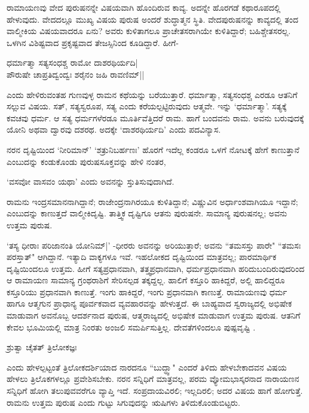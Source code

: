 ರಾಮಾಯಣವು ವೇದ ಪುರುಷನನ್ನೇ ವಿಷಯವಾಗಿ ಹೊಂದಿರುವ ಕಾವ್ಯ. ಅದನ್ನೇ ಹೊರಗಡೆ ಕಥಾರೂಪದಲ್ಲಿ ಹೇಳುವುದು. ವೇದದಲ್ಲೂ ಮುಖ್ಯ ವಿಷಯ ಪುರುಷ ಅಂದರೆ ಶುದ್ಧಾತ್ಮನ ಸ್ಥಿತಿ. ವೇದಪುರುಷನನ್ನು ಕಾವ್ಯದಲ್ಲಿ ತಂದ ವಾಲ್ಮೀಕಿಯ ವಿಷಯವಾದರೂ ಏನು? ಅವರು ಕುಳಿತಾಗಲೂ ಪ್ರಾಚೇತಸರಾಗಿಯೇ ಕುಳಿತಿದ್ದಾರೆ; ಬಹಿಶ್ಚೇತಸರಲ್ಲ. ಒಳಗಿನ ವಿಶಿಷ್ಟವಾದ ಪ್ರಕೃಷ್ಟವಾದ ತೇಜಸ್ಸಿನಿಂದ ಕೂಡಿದ್ದಾರೆ. ಹೀಗೆ-

\begin{shloka}
ಧರ್ಮಾತ್ಮಾ ಸತ್ಯಸಂಧಶ್ಚ ರಾಮೋ ದಾಶರಥಿರ್ಯದಿ|\label{250a}\\
ಪೌರುಷೇ ಚಾಪ್ರತಿದ್ವಂದ್ವಃ ಶರೈನಂ ಜಹಿ ರಾವಣಿಮ್||
\end{shloka}

ಎಂದು ಹೇಳಿರುವಂತಹ ಗುಣವುಳ್ಳ ರಾಮನ ಕಥೆಯನ್ನು ಬರೆಯುತ್ತಾರೆ. ಧರ್ಮಾತ್ಮಾ, ಸತ್ಯಸಂಧಶ್ಚ ಎರಡೂ ಆತನಿಗೆ ಸಲ್ಲುವ ವಿಷಯ. ಸತ್, ಸತ್ಯಸ್ವರೂಪ, ಸತ್ಯ ಎಂದು ಕರೆಯಲ್ಪಟ್ಟಿರುವುದು ಆತ್ಮವೇ. ಇನ್ನು `ಧರ್ಮಾತ್ಮಾ'. ಸತ್ಯಕ್ಕೆ ಕವಚವು ಧರ್ಮ.  ಆ ಸತ್ಯ ಧರ್ಮಗಳೆರಡೂ ಮೂರ್ತಿವೆತ್ತಿದರೆ ರಾಮ. ಹಾಗೆ ಬಂದವನು ರಾಮ. ಅವನು ಬರುವುದಕ್ಕೆ ಯೋನಿ ಅಥವಾ ದ್ವಾರವು ದಶರಥ. ಅದಕ್ಕೇ `ದಾಶರಥಿರ್ಯದಿ' ಎಂದು ಪದವಿನ್ಯಾಸ. 

ನರನ ದೃಷ್ಟಿಯಿಂದ `ನೀರಿಮಾನ್' `ಶತ್ರುನಿಬರ್ಹಣಃ'\label{250f} ಹೊರಗೆ ಇದೆಲ್ಲ ಕಂಡರೂ ಒಳಗೆ ನೋಟಕ್ಕೆ ಹೇಗೆ ಕಾಣುತ್ತಾನೆ ಎಂಬುದನ್ನು ಕಂಡುಕೊಂಡು ಪುರುಷಸೂಕ್ತವನ್ನು ಹೇಳಿ ನಂತರ, 

\begin{shloka}
`ವಸವೋ ವಾಸವಂ ಯಥಾ'\label{250e} ಎಂದು ಅವನನ್ನು ಸ್ತುತಿಸುವುದಾಗಿದೆ.
\end{shloka}

ರಾಮನು ಇಂದ್ರಸಮಾನನಾಗಿದ್ದಾನೆ; ರಾಜೇಂದ್ರನಾಗಿರಯೂ ಕುಳಿತಿದ್ದಾನೆ; ವಿಷ್ಣುವಿನ ಅರ್ಧಾಂಶವಾಗಿಯೂ ಇದ್ದಾನೆ; ಎಂಬುದನ್ನು ಕಾಣುತ್ತದೆ ವಾಲ್ಮೀಕಿದೃಷ್ಟಿ. ತಾತ್ತ್ವಿಕ ದೃಷ್ಟಿಗೂ ಆತನು ಪುರುಷನೇ. ಸಾಮಾನ್ಯ ಪುರುಷನಲ್ಲ; ಅವನು ಉತ್ತಮ ಪುರುಷ. 

`ತಸ್ಯ ಧೀರಾಃ ಪರಿಜಾನಂತಿ ಯೋನಿಮ್|' -ಧೀರರು ಅವನನ್ನು ಅರಿಯುತ್ತಾರೆ; ಅವನು ``ತಮಸಸ್ತು ಪಾರೇ" ``ತಮಸಃ ಪರಸ್ತಾತ್"\label{251} ಆಗಿದ್ದಾನೆ. ಇತ್ಯಾದಿ ವಾಕ್ಯಗಳೂ ಇವೆ. ಇಹಲೋಕದ ದೃಷ್ಟಿಯಿಂದ ಮಾತ್ರವಲ್ಲ; ಪಾರಮಾರ್ಥಿಕ ದೃಷ್ಟಿಯಿಂದಲೂ ಉತ್ತಮ. ಹೀಗೆ ಸತ್ಯಪ್ರಧಾನವಾಗಿ, ತತ್ತ್ವಪ್ರಧಾನವಾಗಿ, ಧರ್ಮಪ್ರಧಾನವಾಗಿ ಹರಿದುಬಂದಿರುವುದರಿಂದ ಆ ರಾಮಾಯಣ ಸಾಮಾನ್ಯ ಗ್ರಂಥರಾಶಿಗೆ ಸೇರಿಸಲ್ಪಡ ತಕ್ಕದ್ದಲ್ಲ. ಹಾಲಿಗೆ ಕಸ್ತೂರಿ ಹಾಕಿದ್ದರೆ, ಅಲ್ಲಿ ಹಾಲಿದ್ದರೂ ಕಸ್ತೂರಿಯು ಪ್ರಧಾನವಾಗಿ ಕಾಣುತ್ತೆ. ಇಂಗು ಹಾಕಿದ್ದರೆ, ಇಂಗು ಪ್ರಧಾನವಾಗಿ ಕಾಣುತ್ತೆ. ರಾಮಾಯಣವು ಧರ್ಮ ಹಾಗೂ ಆತ್ಮಗುನ ಪ್ರಾಧಾನ್ಯ ಪೂರ್ವಕವಾದ ವ್ಯವಹಾರವನ್ನು ಹೇಳುತ್ತದೆ. ಈ ಬಾಹ್ಯವಾದ ಸ್ವರಾಜ್ಯದಲ್ಲಿ ಅಭಿಷೇಕ ಮಾಡುವಾಗ ಅವನೊಬ್ಬ ಆದರ್ಶನಾದ ಪುರುಷ, ಆತ್ಮರಾಜ್ಯದಲ್ಲಿ ಅಭಿಷೇಕ ಮಾಡುವಾಗ ಉತ್ತಮ ಪುರುಷ. ಆತನಿಗೆ ಕೇವಲ ಭೂಮಿಯಲ್ಲಿ ಮಾತ್ರ ನಿಂರತು ಅಂಜಲಿ ಸಮರ್ಪಿಸುತ್ತಿಲ್ಲ. ದೇವತೆಗಳಿಂದಲೂ ಪುಷ್ಪವೃಷ್ಟಿ .

\begin{shloka}
ಶ್ರುತ್ವಾ ಚೈತತ್ ತ್ರಿಲೋಕಜ್ಞಃ\label{251b}
\end{shloka}
ಎಂದು ಹೇಳಲ್ಪಟ್ಟಂತೆ ತ್ರಿಲೋಕದರ್ಶಿಯಾದ ನಾರದನೂ ``ಬುದ್ಧ್ವಾ" ಎಂದರೆ ತಿಳಿದು ಹೇಳಬೇಕಾದವನ ವಿಷಯ ಹೇಳಲು ತ್ರಿಲೊಕಗಳಲ್ಲೂ ಪ್ರವೇಶಿಸಬೇಕು. ನರನ ಸನ್ನಿಧಿಗೆ ಮಾತ್ರವಲ್ಲ, ಪರಮ ವ್ಯೋಮಭಾಸ್ಕರನಾದ ನಾರಾಯಣನ ಸನ್ನಿಧಿಗೆ ಹೋಗಿ ತಲುಪುವವರೆಗೂ ವ್ಯಾಪ್ತಿ ಇದೆ. ಸಂಪ್ರದಾಯವಿರಲಿ; ಇಲ್ಲದಿರಲಿ; ಅದರ ವಿಷಯ ಹಾಗೆ ಹೋಗುತ್ತೆ. ರಾಮನು ಉತ್ತಮ ಪುರುಷ ಎಂದು ಗುಟ್ಟು ಸಿಗುವುದನ್ನು ಋಷಿಗಳು ತಿಳಿದುಕೊಂಡುಬಿಟ್ಟರು.

